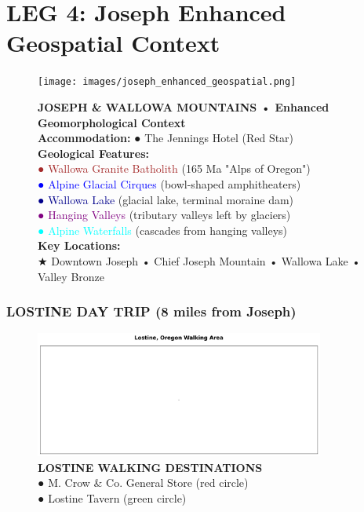 \documentclass[
  10pt,
]{article}
\begin{document}
\newpage

\section{\texorpdfstring{\textcolor{primary}{LEG 4: Joseph Enhanced Geospatial Context}}{}}\label{section-30}

\begin{figure}[h]
\centering
\texttt{[image: images/joseph\_enhanced\_geospatial.png]}
\caption{\textbf{\textcolor{primary}{JOSEPH & WALLOWA MOUNTAINS • Enhanced Geomorphological Context}} \\ 
\textbf{\textcolor{secondary}{Accommodation:}} \textcolor{mapred}{●} The Jennings Hotel (Red Star) \\
\textbf{\textcolor{secondary}{Geological Features:}} \\
\textcolor{brown}{●} \textcolor{brown}{Wallowa Granite Batholith} (165 Ma "Alps of Oregon") \\
\textcolor{blue}{●} \textcolor{blue}{Alpine Glacial Cirques} (bowl-shaped amphitheaters) \\
\textcolor{darkblue}{●} \textcolor{darkblue}{Wallowa Lake} (glacial lake, terminal moraine dam) \\
\textcolor{purple}{●} \textcolor{purple}{Hanging Valleys} (tributary valleys left by glaciers) \\
\textcolor{cyan}{●} \textcolor{cyan}{Alpine Waterfalls} (cascades from hanging valleys) \\
\textbf{\textcolor{secondary}{Key Locations:}} \\
\textcolor{mapred}{★} Downtown Joseph • Chief Joseph Mountain • Wallowa Lake • Valley Bronze}
\end{figure}

\subsubsection{\texorpdfstring{\textcolor{primary}{LOSTINE DAY TRIP (8 miles from Joseph)}}{}}\label{section-31}

\begin{figure}[h]
\centering
\includegraphics[width=0.85\textwidth]{images/lostine_oregon_town_walking_map.png}
\caption{\textbf{\textcolor{primary}{LOSTINE WALKING DESTINATIONS}} \\ 
\textcolor{mapred}{●} \textcolor{mapred}{M. Crow \& Co. General Store} (red circle) \\
\textcolor{mapgreen}{●} \textcolor{mapgreen}{Lostine Tavern} (green circle)}
\end{figure}
\end{document}
